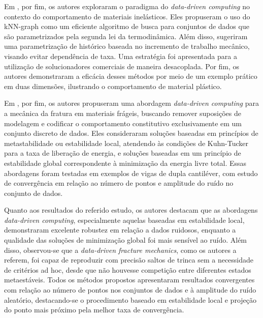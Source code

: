 Em \cite{Prume2023}, por fim, os autores exploraram o paradigma do \textit{data-driven computing} no contexto do comportamento de materiais inelásticos. Eles propuseram o uso do kNN-graph como um eficiente algoritmo de busca para conjuntos de dados que são parametrizados pela segunda lei da termodinâmica.  Além disso, sugeriram uma parametrização de histórico baseada no incremento de trabalho mecânico, visando evitar dependência de taxa. Uma estratégia foi apresentada para a utilização de solucionadores comerciais de maneira desacoplada. Por fim, os autores demonstraram a eficácia desses métodos por meio de um exemplo prático em duas dimensões, ilustrando o comportamento de material plástico.

Em \cite{Carrara2020}, por fim, os autores propuseram uma abordagem \textit{data-driven computing} para a mecânica da fratura em materiais frágeis, buscando remover suposições de modelagem e codificar o comportamento constitutivo exclusivamente em um conjunto discreto de dados. Eles consideraram soluções baseadas em princípios de metastabilidade ou estabilidade local, atendendo às condições de Kuhn-Tucker para a taxa de liberação de energia, e soluções baseadas em um princípio de estabilidade global correspondente à minimização da energia livre total. Essas abordagens foram testadas em exemplos de vigas de dupla cantiléver, com estudo de convergência em relação ao número de pontos e amplitude do ruído no conjunto de dados.

Quanto aos resultados do referido estudo, os autores destacam que as abordagens \textit{data-driven computing}, especialmente aquelas baseadas em estabilidade local, demonstraram excelente robustez em relação a dados ruidosos, enquanto a qualidade das soluções de minimização global foi mais sensível ao ruído. Além disso, observou-se que a \textit{data-driven fracture mechanics}, como os autores a referem, foi capaz de reproduzir com precisão saltos de trinca sem a necessidade de critérios ad hoc, desde que não houvesse competição entre diferentes estados metaestáveis. Todos os métodos propostos apresentaram resultados convergentes com relação ao número de pontos nos conjuntos de dados e à amplitude do ruído aleatório, destacando-se o procedimento baseado em estabilidade local e projeção do ponto mais próximo pela melhor taxa de convergência.